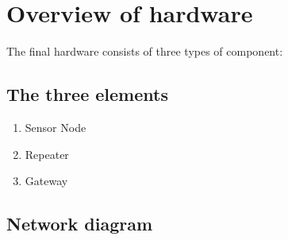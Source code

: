 \section{Overview of hardware}

The final hardware consists of three types of component:

\subsection{The three elements}

\begin{enumerate}
    \item Sensor Node
    \item Repeater
    \item Gateway
\end{enumerate}

\subsection{Network diagram}



